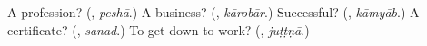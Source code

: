 \begin{tcolorbox}[breakable,colback=teal!4,colframe=teal!35!black,title={Before you move on}]
A profession? (\textbf{}, \emph{peshā}.) A business? (\textbf{}, \emph{kārobār}.) Successful? (\textbf{}, \emph{kāmyāb}.) A certificate? (\textbf{}, \emph{sanad}.) To get down to work? (\textbf{}, \emph{juṭṭṇā}.)
\end{tcolorbox}

